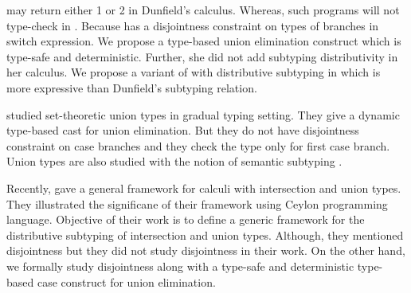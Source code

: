 \noindent may return either 1 or 2 in Dunfield's calculus.
Whereas, such programs will not
type-check in \cal. Because \cal has a disjointness constraint on
types of branches in switch expression.
We propose a type-based union elimination construct which is
type-safe and deterministic.
Further, she did not add subtyping distributivity in her calculus.
We propose a variant of \cal with distributive subtyping in 
which is more expressive than Dunfield's subtyping relation.

\citet{castagna2017gradual} studied
set-theoretic union types in gradual typing setting. They
give a dynamic type-based cast for union elimination. But they do not
have disjointness constraint on case branches and they check the type
only for first case branch.
Union types are also studied with the notion of semantic subtyping 
\cite{frisch2002semantic,castagna2005gentle,frisch2008semantic}.

Recently, \citet{muehlboeck2018empowering} gave a general framework for calculi
with intersection and union types. They illustrated the significane of
their framework using Ceylon programming language.
Objective of their work is to define a generic framework for the 
distributive subtyping of intersection and union types.
Although, they mentioned disjointness but they did not study disjointness
in their work. On the other hand, we formally study disjointness
along with a type-safe and deterministic type-based case construct for union elimination.


